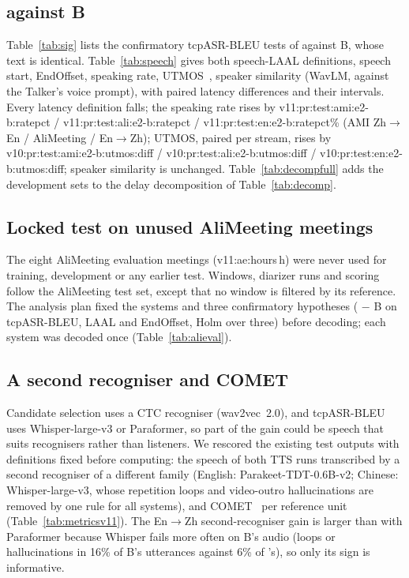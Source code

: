 \subsection{\sys{} against B}
Table~\ref{tab:sig} lists the confirmatory tcpASR-BLEU tests of \sys{} against B, whose text is identical.
Table~\ref{tab:speech} gives both speech-LAAL definitions, speech start, EndOffset, speaking rate,
UTMOS~\citep{saeki2022utmos}, speaker similarity (WavLM, against the Talker's voice prompt), with paired
latency differences and their intervals. Every latency definition falls; the speaking rate rises by
\num{v11:pr:test:ami:e2-b:ratepct} / \num{v11:pr:test:ali:e2-b:ratepct} / \num{v11:pr:test:en:e2-b:ratepct}\%
(AMI Zh$\rightarrow$En / AliMeeting / En$\rightarrow$Zh); UTMOS, paired per stream, rises by
\num{v10:pr:test:ami:e2-b:utmos:diff} / \num{v10:pr:test:ali:e2-b:utmos:diff} / \num{v10:pr:test:en:e2-b:utmos:diff};
speaker similarity is unchanged. Table~\ref{tab:decompfull} adds the
development sets to the delay decomposition of Table~\ref{tab:decomp}.




\ifAliEval
\subsection{Locked test on unused AliMeeting meetings}
\label{app:alieval}
The eight AliMeeting evaluation meetings (\num{v11:ae:hours}\,h) were never used for training, development or any
earlier test. Windows, diarizer runs and scoring follow the AliMeeting test set, except that no window is filtered by
its reference. The analysis plan fixed the systems and three confirmatory hypotheses (\sys{} $-$ B on tcpASR-BLEU, LAAL
and EndOffset, Holm over three) before decoding; each system was decoded once (Table~\ref{tab:alieval}).

\fi

\ifMetricsV
\subsection{A second recogniser and COMET}
\label{app:metricsv11}
Candidate selection uses a CTC recogniser (wav2vec~2.0), and tcpASR-BLEU uses Whisper-large-v3 or Paraformer, so part
of the gain could be speech that suits recognisers rather than listeners. We rescored the existing test outputs with
definitions fixed before computing: the speech of both TTS runs transcribed by a second recogniser of a different
family (English: Parakeet-TDT-0.6B-v2; Chinese: Whisper-large-v3, whose repetition loops and video-outro hallucinations
are removed by one rule for all systems), and COMET~\citep{rei2022comet} per reference unit (Table~\ref{tab:metricsv11}).
The En$\rightarrow$Zh second-recogniser gain is larger than with Paraformer because Whisper fails more often on B's
audio (loops or hallucinations in 16\% of B's utterances against 6\% of \sys{}'s), so only its sign is informative.

\fi

